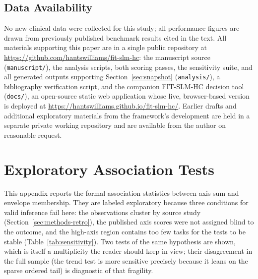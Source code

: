 \documentclass[11pt]{article}
\begin{document}
\subsection*{Data Availability}
No new clinical data were collected for this study; all performance figures are drawn from previously published benchmark results cited in the text. All materials supporting this paper are in a single public repository at \url{https://github.com/hantswilliams/fit-slm-hc}: the manuscript source (\texttt{manuscript/}), the analysis scripts, both scoring passes, the sensitivity suite, and all generated outputs supporting Section~\ref{sec:snapshot} (\texttt{analysis/}), a bibliography verification script, and the companion FIT-SLM-HC decision tool (\texttt{docs/}), an open-source static web application whose live, browser-based version is deployed at \url{https://hantswilliams.github.io/fit-slm-hc/}. Earlier drafts and additional exploratory materials from the framework's development are held in a separate private working repository and are available from the author on reasonable request.

\appendix
\renewcommand{\thetable}{\Alph{section}\arabic{table}}
\setcounter{table}{0}

\section{Exploratory Association Tests}
\label{app:tests}

This appendix reports the formal association statistics between axis sum and envelope membership. They are labeled exploratory because three conditions for valid inference fail here: the observations cluster by source study (Section~\ref{sec:methods-retro}), the published axis scores were not assigned blind to the outcome, and the high-axis region contains too few tasks for the tests to be stable (Table~\ref{tab:sensitivity}). Two tests of the same hypothesis are shown, which is itself a multiplicity the reader should keep in view; their disagreement in the full sample (the trend test is more sensitive precisely because it leans on the sparse ordered tail) is diagnostic of that fragility.
\end{document}
